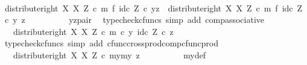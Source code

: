 \begin{isabellebody}
\ \ \ \ \isamarkupfalse%
\ {\isacharminus}{\kern0pt}\isanewline
\ \ \ \ \ \ \isamarkupfalse%
\ {\isachardoublequoteopen}{\isacharparenleft}{\kern0pt}distribute{\isacharunderscore}{\kern0pt}right\ X\ X\ Z\ {\isasymcirc}\isactrlsub c\ {\isacharparenleft}{\kern0pt}m\ {\isasymtimes}\isactrlsub f\ id\isactrlsub c\ Z{\isacharparenright}{\kern0pt}{\isacharparenright}{\kern0pt}\ {\isasymcirc}\isactrlsub c\ yz\ {\isacharequal}{\kern0pt}\ distribute{\isacharunderscore}{\kern0pt}right\ X\ X\ Z\ {\isasymcirc}\isactrlsub c\ {\isacharparenleft}{\kern0pt}m\ {\isasymtimes}\isactrlsub f\ id\isactrlsub c\ Z{\isacharparenright}{\kern0pt}\ {\isasymcirc}\isactrlsub c\ {\isasymlangle}y{\isacharcomma}{\kern0pt}\ z{\isasymrangle}{\isachardoublequoteclose}\isanewline
\ \ \ \ \ \ \ \ \isamarkupfalse%
\ yz{\isacharunderscore}{\kern0pt}pair\ \isamarkupfalse%
\ {\isacharparenleft}{\kern0pt}typecheck{\isacharunderscore}{\kern0pt}cfuncs{\isacharcomma}{\kern0pt}\ simp\ add{\isacharcolon}{\kern0pt}\ comp{\isacharunderscore}{\kern0pt}associative{}{\isacharparenright}{\kern0pt}\isanewline
\ \ \ \ \ \ \isamarkupfalse%
\ \isamarkupfalse%
\ {\isachardoublequoteopen}{\isachardot}{\kern0pt}{\isachardot}{\kern0pt}{\isachardot}{\kern0pt}\ {\isacharequal}{\kern0pt}\ distribute{\isacharunderscore}{\kern0pt}right\ X\ X\ Z\ {\isasymcirc}\isactrlsub c\ {\isasymlangle}m\ {\isasymcirc}\isactrlsub c\ y{\isacharcomma}{\kern0pt}\ id\isactrlsub c\ Z\ {\isasymcirc}\isactrlsub c\ z{\isasymrangle}{\isachardoublequoteclose}\isanewline
\ \ \ \ \ \ \ \ \isamarkupfalse%
\ {\isacharparenleft}{\kern0pt}typecheck{\isacharunderscore}{\kern0pt}cfuncs{\isacharcomma}{\kern0pt}\ simp\ add{\isacharcolon}{\kern0pt}\ cfunc{\isacharunderscore}{\kern0pt}cross{\isacharunderscore}{\kern0pt}prod{\isacharunderscore}{\kern0pt}comp{\isacharunderscore}{\kern0pt}cfunc{\isacharunderscore}{\kern0pt}prod{\isacharparenright}{\kern0pt}\isanewline
\ \ \ \ \ \ \isamarkupfalse%
\ \isamarkupfalse%
\ {\isachardoublequoteopen}{\isachardot}{\kern0pt}{\isachardot}{\kern0pt}{\isachardot}{\kern0pt}\ {\isacharequal}{\kern0pt}\ distribute{\isacharunderscore}{\kern0pt}right\ X\ X\ Z\ {\isasymcirc}\isactrlsub c\ {\isasymlangle}{\isasymlangle}my{}{\isacharcomma}{\kern0pt}my{}{\isasymrangle}{\isacharcomma}{\kern0pt}\ z{\isasymrangle}{\isachardoublequoteclose}\isanewline
\ \ \ \ \ \ \ \ \isamarkupfalse%
\ my{\isacharunderscore}{\kern0pt}def\ \isamarkupfalse%

\end{isabellebody}
